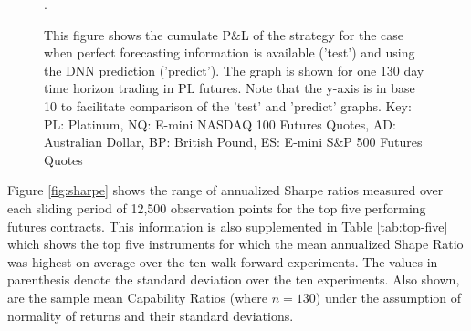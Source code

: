 \documentclass{article}
\begin{document}
\begin{figure}[H]
	\vspace{-60pt}
	\caption{This figure shows the cumulate P\&L of the strategy for the case when perfect forecasting information is available ('test') and using the DNN prediction ('predict').  The graph is shown for one 130 day time horizon trading in PL futures. Note that the y-axis is in base 10 to facilitate comparison of the 'test' and 'predict' graphs. Key: PL: Platinum, NQ: E-mini NASDAQ 100 Futures Quotes, AD: Australian Dollar, BP: British Pound, ES: E-mini S\&P 500 Futures Quotes}.
	\label{fig:pnl}
\end{figure}

Figure \ref{fig:sharpe} shows the range of annualized Sharpe ratios measured over each sliding period of 12,500 observation points for the top five performing futures contracts. This information is also supplemented in Table \ref{tab:top-five} which shows the top five instruments for which the mean annualized Shape Ratio was highest on average over the ten walk forward experiments. The values in parenthesis denote the standard deviation over the ten experiments. Also shown, are the sample mean Capability Ratios (where $n=130$) under the assumption of normality of returns and their standard deviations. 
\end{document}
